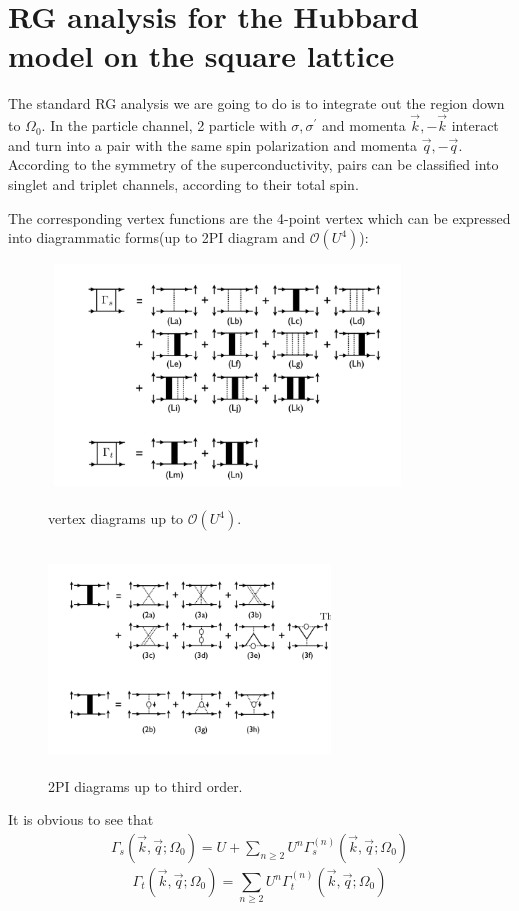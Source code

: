 \documentclass[12pt]{article}
\numberwithin{equation}{section}
\begin{document}
\section{RG analysis for the Hubbard model on the square lattice}
The standard RG analysis we are going to do is to integrate out the region down to $\Omega_0$. In the particle channel, 2 particle with $\sigma,\sigma^\prime$ and momenta $\vec{k}, -\vec{k}$ interact and 
turn into a pair with the same spin polarization and momenta $\vec{q}, -\vec{q}$. According to the symmetry of the superconductivity, pairs can be classified into singlet and triplet channels, according to their total spin.\par 
The corresponding vertex functions are the 4-point vertex which can be expressed into diagrammatic forms(up to 2PI diagram and $\mathcal{O}(U^4)$):
	\begin{figure}[htbp]
		\begin{minipage}[t]{0.4\linewidth}
		\centering
		\includegraphics[height=6cm,width=9.5cm]{截屏2020-10-18 下午4.18.55.png}
		\caption{vertex diagrams up to $\mathcal{O}(U^4)$.}
		\end{minipage}
		\hfill
		\begin{minipage}[t]{0.5\linewidth}
		\centering
		\includegraphics[height=6cm,width=7.5cm]{截屏2020-10-19 上午10.58.17.png}
		\caption{2PI diagrams up to third order.}
		\end{minipage}
	\end{figure}
It is obvious to see that 
\begin{equation}
	\begin{aligned}
\Gamma_{s}\left(\vec{k}, \vec{q} ; \Omega_{0}\right)=U+\sum_{n \geq 2} U^{n} \Gamma_{s}^{(n)}\left(\vec{k}, \vec{q} ; \Omega_{0}\right)
	\end{aligned}
\end{equation}
\begin{equation}
	\Gamma_{t}\left(\vec{k}, \vec{q} ; \Omega_{0}\right)=\sum_{n \geq 2} U^{n} \Gamma_{t}^{(n)}\left(\vec{k}, \vec{q} ; \Omega_{0}\right)
	\end{equation}
\end{document}
